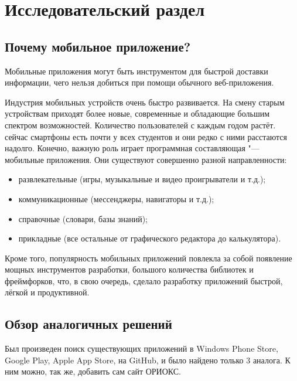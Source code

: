 \chapter{Исследовательский раздел}
\label{ch:research}
%
%

\section{Почему мобильное приложение?}
\label{sec:whyApp}

Мобильные приложения могут быть инструментом для быстрой доставки информации, чего нельзя добиться при помощи обычного веб-приложения.

Индустрия мобильных устройств очень быстро развивается.
На смену старым устройствам приходят более новые, современные и обладающие большим спектром возможностей.
Количество пользователей с каждым годом растёт.
сейчас смартфоны есть почти у всех студентов и они редко с ними расстаются надолго.
Конечно, важную роль играет программная составляющая "--- мобильные приложения.
Они существуют совершенно разной направленности:
\begin{itemize}
  \item развлекательные (игры, музыкальные и видео проигрыватели и т.д.);
  \item коммуникационные (мессенджеры, навигаторы и т.д.);
  \item справочные (словари, базы знаний);
  \item прикладные (все остальные от графического редактора до калькулятора).
\end{itemize}

Кроме того, популярность мобильных приложений повлекла за собой появление мощных инструментов разработки, большого количества библиотек и фреймфорков, что, в свою очередь, сделало разработку приложений быстрой, лёгкой и продуктивной.


\section{Обзор аналогичных решений}
\label{sec:analogs}

Был произведен поиск существующих приложений в Windows Phone Store, Google Play, Apple App Store, на GitHub, и было найдено только 3 аналога.
К ним можно, так же, добавить сам сайт ОРИОКС.

